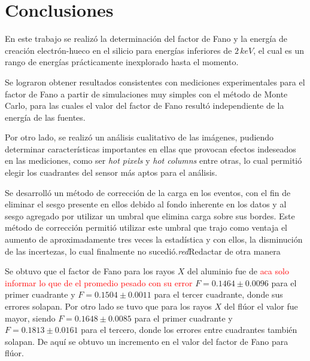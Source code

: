 \chapter{Conclusiones}
\noindent En este trabajo se realizó la determinación del factor de Fano y la energía de creación electrón-hueco en el silicio para energías inferiores de $2\,\si{keV}$, el cual es un rango de energías prácticamente inexplorado hasta el momento.


Se lograron obtener resultados consistentes con mediciones experimentales para el factor de Fano a partir de simulaciones muy simples con el método de Monte Carlo, para las cuales el valor del factor de Fano resultó independiente de la energía de las fuentes.

Por otro lado, se realizó un análisis cualitativo de las imágenes, pudiendo determinar características importantes en ellas que provocan efectos indeseados en las mediciones, como ser \textit{hot pixels} y \textit{hot columns} entre otras, lo cual permitió elegir los cuadrantes del sensor más aptos para el análisis.

Se desarrolló un método de corrección de la carga en los eventos, con el fin de eliminar el sesgo presente en ellos debido al fondo inherente en los datos y al sesgo agregado por utilizar un umbral que elimina carga sobre sus bordes. Este método de corrección permitió utilizar este umbral que trajo como ventaja el aumento de aproximadamente tres veces la estadística y con ellos, la disminución de las incertezas, lo cual finalmente no sucedió.\textit{red}{Redactar de otra manera}

Se obtuvo que el factor de Fano para los rayos $X$ del aluminio fue de \textcolor{red}{aca solo informar lo que de el promedio pesado con su error} $F = 0.1464 \pm 0.0096$ para el primer cuadrante y $F = 0.1504 \pm 0.0011$ para el tercer cuadrante, donde sus errores solapan. Por otro lado se tuvo que para los rayos $X$ del flúor el valor fue mayor, siendo $F = 0.1648 \pm 0.0085$ para el primer cuadrante y $F = 0.1813 \pm 0.0161$ para el tercero, donde los errores entre cuadrantes también solapan. De aquí se obtuvo un incremento en el valor del factor de Fano para flúor.

